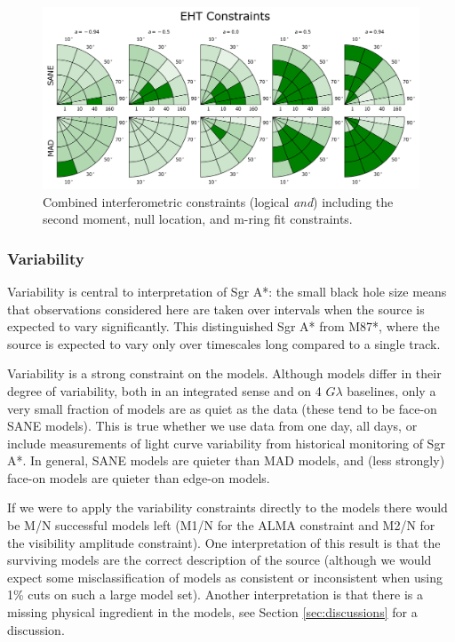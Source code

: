 \begin{figure}
  \centering
    \includegraphics[width=\columnwidth]{./figures/Interferometric_Constraints.png}
  \caption{Combined interferometric constraints (logical {\em and}) including the second moment, null location, and m-ring fit constraints.}
  \label{fig:all_EHT_constraints}
\end{figure}

\subsubsection{Variability}

Variability is central to interpretation of Sgr A*: the small black hole size means that observations considered here are taken over intervals when the source is expected to vary significantly.  This distinguished Sgr A* from M87*, where the source is expected to vary only over timescales long compared to a single track.

Variability is a strong constraint on the models.  Although models differ in their degree of variability, both in an integrated sense and on 4 $G\lambda$ baselines, only a very small fraction of models are as quiet as the data (these tend to be face-on SANE models).  This is true whether we use data from one day, all days, or include measurements of light curve variability from historical monitoring of Sgr A*.   In general, SANE models are quieter than MAD models, and (less strongly) face-on models are quieter than edge-on models.

If we were to apply the variability constraints directly to the models there would be M/N successful models left (M1/N for the ALMA constraint and M2/N for the visibility amplitude constraint).  One interpretation of this result is that the surviving models are the correct description of the source (although we would expect some misclassification of models as consistent or inconsistent when using 1\% cuts on such a large model set).  Another interpretation is that there is a missing physical ingredient in the models, see Section \ref{sec:discussions} for a discussion.

